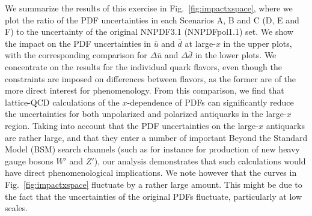 We summarize the results of this exercise in Fig.~\ref{fig:impactxspace}, 
where we plot the ratio of the PDF uncertainties in each Scenarios A, B and C 
(D, E and F) to the uncertainty of the original
NNPDF3.1 (NNPDFpol1.1) set.
%
We show the impact on the PDF uncertainties
in $\bar{u}$ and $\bar{d}$ at large-$x$ in the upper
plots, with the corresponding comparison for $\Delta\bar{u}$
and $\Delta\bar{d}$ in the lower plots.
%
We concentrate on the results for the individual quark flavors, even though 
the constraints are imposed on differences between flavors, as the former are 
of the more direct interest for phenomenology. 
%
From this comparison, we find that lattice-QCD calculations of the 
$x$-dependence of PDFs can significantly reduce the uncertainties for both 
unpolarized and polarized antiquarks in the large-$x$ region.
%
Taking into account that the PDF uncertainties on the large-$x$
antiquarks are rather large, and that they
enter a number of important Beyond the Standard Model (BSM) search channels
(such as for instance for production of new heavy gauge bosons $W'$ and $Z'$),
our analysis demonstrates that such calculations would have direct
phenomenological implications.
%
We note however that the curves in Fig.~\ref{fig:impactxspace}
fluctuate by a rather large amount.
%
This might be due to the fact that the uncertainties of the original PDFs
fluctuate, particularly at low scales.

